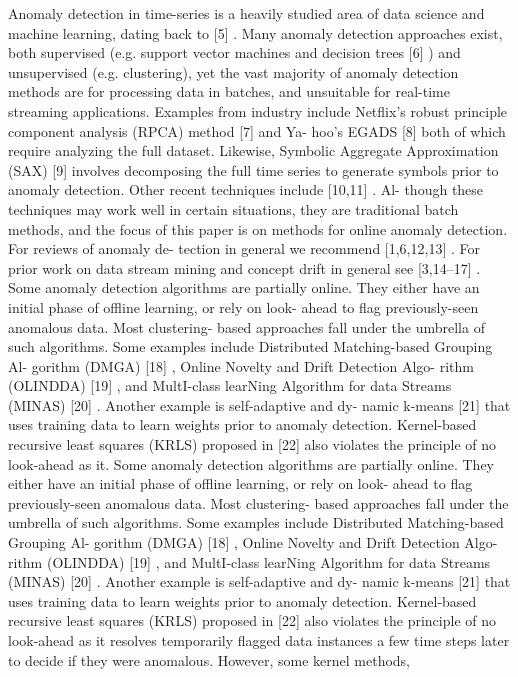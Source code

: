 \documentclass[12pt]{article}
\begin{document}
Anomaly detection in time-series is a heavily studied area
of data science and machine learning, dating back to [5] . Many
anomaly detection approaches exist, both supervised (e.g. support
vector machines and decision trees [6] ) and unsupervised (e.g.
clustering), yet the vast majority of anomaly detection methods
are for processing data in batches, and unsuitable for real-time
streaming applications. Examples from industry include Netflix’s
robust principle component analysis (RPCA) method [7] and Ya-
hoo’s EGADS [8] both of which require analyzing the full dataset.
Likewise, Symbolic Aggregate Approximation (SAX) [9] involves
decomposing the full time series to generate symbols prior to
anomaly detection. Other recent techniques include [10,11] . Al-
though these techniques may work well in certain situations, they
are traditional batch methods, and the focus of this paper is on
methods for online anomaly detection. For reviews of anomaly de-
tection in general we recommend [1,6,12,13] . For prior work on
data stream mining and concept drift in general see [3,14–17] .
Some anomaly detection algorithms are partially online. They
either have an initial phase of offline learning, or rely on look-
ahead to flag previously-seen anomalous data. Most clustering-
based approaches fall under the umbrella of such algorithms.
Some examples include Distributed Matching-based Grouping Al-
gorithm (DMGA) [18] , Online Novelty and Drift Detection Algo-
rithm (OLINDDA) [19] , and MultI-class learNing Algorithm for data
Streams (MINAS) [20] . Another example is self-adaptive and dy-
namic k-means [21] that uses training data to learn weights prior
to anomaly detection. Kernel-based recursive least squares (KRLS)
proposed in [22] also violates the principle of no look-ahead as it. Some anomaly detection algorithms are partially online. They
either have an initial phase of offline learning, or rely on look-
ahead to flag previously-seen anomalous data. Most clustering-
based approaches fall under the umbrella of such algorithms.
Some examples include Distributed Matching-based Grouping Al-
gorithm (DMGA) [18] , Online Novelty and Drift Detection Algo-
rithm (OLINDDA) [19] , and MultI-class learNing Algorithm for data
Streams (MINAS) [20] . Another example is self-adaptive and dy-
namic k-means [21] that uses training data to learn weights prior
to anomaly detection. Kernel-based recursive least squares (KRLS)
proposed in [22] also violates the principle of no look-ahead as it resolves temporarily flagged data instances a few time steps later
to decide if they were anomalous. However, some kernel methods,
\end{document}
